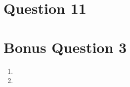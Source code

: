 \documentclass{article}
\begin{document}
\section{Question 11}

\section{Bonus Question 3}

\begin{enumerate}[label=(\alph*)]

    \item 

    
    \item 

\end{enumerate}


\end{document}
